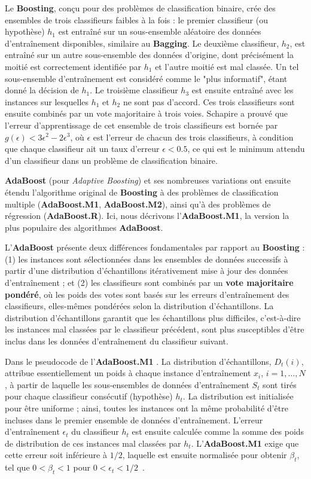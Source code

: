 Le \textbf{Boosting}, conçu pour des problèmes de classification binaire, crée des ensembles de trois classifieurs faibles à la fois : le premier classifieur (ou hypothèse) $h_1$ est entraîné sur un sous-ensemble aléatoire des données d'entraînement disponibles, similaire au \textbf{Bagging}. Le deuxième classifieur, $h_2$, est entraîné sur un autre sous-ensemble des données d'origine, dont précisément la moitié est correctement identifiée par $h_1$ et l'autre moitié est mal classée. Un tel sous-ensemble d'entraînement est considéré comme le "plus informatif", étant donné la décision de $h_1$. Le troisième classifieur $h_3$ est ensuite entraîné avec les instances sur lesquelles $h_1$ et $h_2$ ne sont pas d'accord. Ces trois classifieurs sont ensuite combinés par un vote majoritaire à trois voies. Schapire a prouvé que l'erreur d'apprentissage de cet ensemble de trois classifieurs est bornée par $g(\epsilon) < 3\epsilon^2 - 2\epsilon^3$, où $\epsilon$ est l'erreur de chacun des trois classifieurs, à condition que chaque classifieur ait un taux d'erreur $\epsilon < 0.5$, ce qui est le minimum attendu d'un classifieur dans un problème de classification binaire.

\textbf{AdaBoost} (pour \textit{Adaptive Boosting}) et ses nombreuses variations ont ensuite étendu l'algorithme original de \textbf{Boosting} à des problèmes de classification multiple (\textbf{AdaBoost.M1}, \textbf{AdaBoost.M2}), ainsi qu'à des problèmes de régression (\textbf{AdaBoost.R}). Ici, nous décrivons l'\textbf{AdaBoost.M1}, la version la plus populaire des algorithmes \textbf{AdaBoost}.

L'\textbf{AdaBoost} présente deux différences fondamentales par rapport au \textbf{Boosting} : (1) les instances sont sélectionnées dans les ensembles de données successifs à partir d'une distribution d'échantillons itérativement mise à jour des données d'entraînement ; et (2) les classifieurs sont combinés par un \textbf{vote majoritaire pondéré}, où les poids des votes sont basés sur les erreurs d'entraînement des classifieurs, elles-mêmes pondérées selon la distribution d'échantillons. La distribution d'échantillons garantit que les échantillons plus difficiles, c'est-à-dire les instances mal classées par le classifieur précédent, sont plus susceptibles d'être inclus dans les données d'entraînement du classifieur suivant.

Dans le pseudocode de l'\textbf{AdaBoost.M1} . La distribution d'échantillons, $D_t(i)$, attribue essentiellement un poids à chaque instance d'entraînement $x_i$, $i = 1, \dots, N$, à partir de laquelle les sous-ensembles de données d'entraînement $S_t$ sont tirés pour chaque classifieur consécutif (hypothèse) $h_t$. La distribution est initialisée pour être uniforme ; ainsi, toutes les instances ont la même probabilité d'être incluses dans le premier ensemble de données d'entraînement. L'erreur d'entraînement $\epsilon_t$ du classifieur $h_t$ est ensuite calculée comme la somme des poids de distribution de ces instances mal classées par $h_t$. L'\textbf{AdaBoost.M1} exige que cette erreur soit inférieure à $1/2$, laquelle est ensuite normalisée pour obtenir $\beta_t$, tel que $0 < \beta_t < 1$ pour $0 < \epsilon_t < 1/2$~\cite{polikar2012ensemble}.
